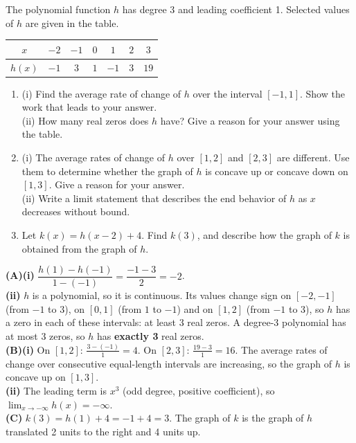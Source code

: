 \documentclass[11pt]{article}
\begin{document}
\begin{exo}{}
The polynomial function $h$ has degree 3 and leading coefficient 1. Selected values of $h$ are given in the table.
\begin{center}\begin{tabular}{c|cccccc}
$x$ & $-2$ & $-1$ & $0$ & $1$ & $2$ & $3$\\\hline $h(x)$ & $-1$ & $3$ & $1$ & $-1$ & $3$ & $19$\end{tabular}\end{center}
\begin{enumerate}[label=(\Alph*)]
\item (i) Find the average rate of change of $h$ over the interval $[-1,1]$. Show the work that leads to your answer.\\
(ii) How many real zeros does $h$ have? Give a reason for your answer using the table.
\item (i) The average rates of change of $h$ over $[1,2]$ and $[2,3]$ are different. Use them to determine whether the graph of $h$ is concave up or concave down on $[1,3]$. Give a reason for your answer.\\
(ii) Write a limit statement that describes the end behavior of $h$ as $x$ decreases without bound.
\item Let $k(x)=h(x-2)+4$. Find $k(3)$, and describe how the graph of $k$ is obtained from the graph of $h$.
\end{enumerate}
\begin{solution}
\textbf{(A)(i)} $\dfrac{h(1)-h(-1)}{1-(-1)}=\dfrac{-1-3}{2}=-2$.\\
\textbf{(ii)} $h$ is a polynomial, so it is continuous. Its values change sign on $[-2,-1]$ (from $-1$ to $3$), on $[0,1]$ (from $1$ to $-1$) and on $[1,2]$ (from $-1$ to $3$), so $h$ has a zero in each of these intervals: at least 3 real zeros. A degree-3 polynomial has at most 3 zeros, so $h$ has \textbf{exactly 3} real zeros.\\
\textbf{(B)(i)} On $[1,2]$: $\frac{3-(-1)}{1}=4$. On $[2,3]$: $\frac{19-3}{1}=16$. The average rates of change over consecutive equal-length intervals are increasing, so the graph of $h$ is concave up on $[1,3]$.\\
\textbf{(ii)} The leading term is $x^3$ (odd degree, positive coefficient), so $\displaystyle\lim_{x\to-\infty}h(x)=-\infty$.\\
\textbf{(C)} $k(3)=h(1)+4=-1+4=3$. The graph of $k$ is the graph of $h$ translated 2 units to the right and 4 units up.
\end{solution}
\end{exo}
\end{document}

